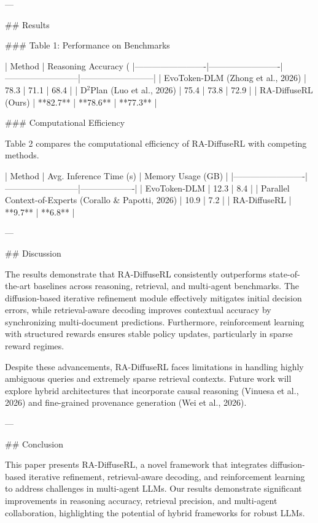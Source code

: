 ---

## Results

### Table 1: Performance on Benchmarks

| Method                  | Reasoning Accuracy (%
|-------------------------|-------------------------|--------------------------|--------------------------|
| EvoToken-DLM (Zhong et al., 2026) | 78.3                   | 71.1                    | 68.4                    |
| D$^2$Plan (Luo et al., 2026)      | 75.4                   | 73.8                    | 72.9                    |
| RA-DiffuseRL (Ours)               | **82.7**               | **78.6**                | **77.3**                |

### Computational Efficiency

Table 2 compares the computational efficiency of RA-DiffuseRL with competing methods.

| Method                  | Avg. Inference Time (s) | Memory Usage (GB) |
|-------------------------|--------------------------|-------------------|
| EvoToken-DLM            | 12.3                    | 8.4               |
| Parallel Context-of-Experts (Corallo & Papotti, 2026) | 10.9          | 7.2               |
| RA-DiffuseRL            | **9.7**                 | **6.8**           |

---

## Discussion

The results demonstrate that RA-DiffuseRL consistently outperforms state-of-the-art baselines across reasoning, retrieval, and multi-agent benchmarks. The diffusion-based iterative refinement module effectively mitigates initial decision errors, while retrieval-aware decoding improves contextual accuracy by synchronizing multi-document predictions. Furthermore, reinforcement learning with structured rewards ensures stable policy updates, particularly in sparse reward regimes.

Despite these advancements, RA-DiffuseRL faces limitations in handling highly ambiguous queries and extremely sparse retrieval contexts. Future work will explore hybrid architectures that incorporate causal reasoning (Vinuesa et al., 2026) and fine-grained provenance generation (Wei et al., 2026).

---

## Conclusion

This paper presents RA-DiffuseRL, a novel framework that integrates diffusion-based iterative refinement, retrieval-aware decoding, and reinforcement learning to address challenges in multi-agent LLMs. Our results demonstrate significant improvements in reasoning accuracy, retrieval precision, and multi-agent collaboration, highlighting the potential of hybrid frameworks for robust LLMs.

